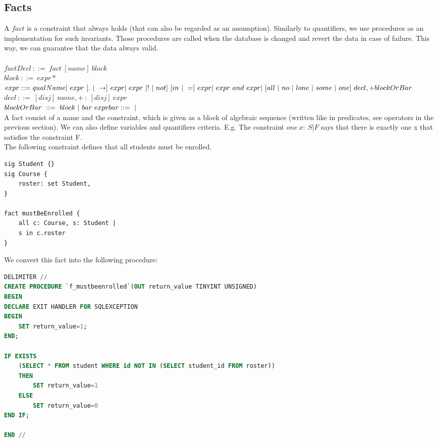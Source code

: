 \documentclass[oneside]{book}
\begin{document}
\subsection{Facts}
\label{sec:factsgen}
A $fact$ is a constraint that always holds (that can also be regarded as an assumption). Similarly to quantifiers, we use procedures as an implementation for such invariants. Those procedures are called when the database is changed and revert the data in case of failure. This way, we can guarantee that the data always valid. \\\\
$factDecl\ ::=\ fact\ [name]\ block$\\
$block\ ::=\ { expr* }$\\
$expr ::= qualName\\
|\ expr\ [.\ |\ \rightarrow]\ expr \\
|\ expr\ [!\ |\ not]\ [in\ |\ =]\ expr\\
|\ expr\ and\ expr\\
|\ [all\ |\ no\ |\ lone\ |\ some\ |\ one]\ decl,+ blockOrBar$\\
$decl\ ::=\ [disj]\ name,+\ :\ [disj]\ expr$\\
$blockOrBar\ ::=\ block\ |\ bar\ expr\\
bar ::=\ |$\\

A fact consist of a name and the constraint, which is given as a block of algebraic sequence (written like in predicates, see operators in the previous section). We can also define variables and quantifiers criteria. E.g. The constraint $one\ x:\ S | F$ says that there is exactly one x that satisfies the constraint F.\\

The following constraint defines that all students must be enrolled.

\begin{lstlisting}
sig Student {}
sig Course {
	roster: set Student,
}

fact mustBeEnrolled {
	all c: Course, s: Student | 
	s in c.roster
}
\end{lstlisting}

We convert this fact into the following procedure:

\begin{lstlisting}[escapechar=@,language=SQL]
DELIMITER //
CREATE PROCEDURE `f_mustbeenrolled`(OUT return_value TINYINT UNSIGNED)
BEGIN
DECLARE EXIT HANDLER FOR SQLEXCEPTION
BEGIN
	SET return_value=1;
END;

IF EXISTS
	(SELECT * FROM student WHERE id NOT IN (SELECT student_id FROM roster))
	THEN
		SET return_value=1
	ELSE
		SET return_value=0
END IF;
	
END //
\end{lstlisting}
\end{document}
